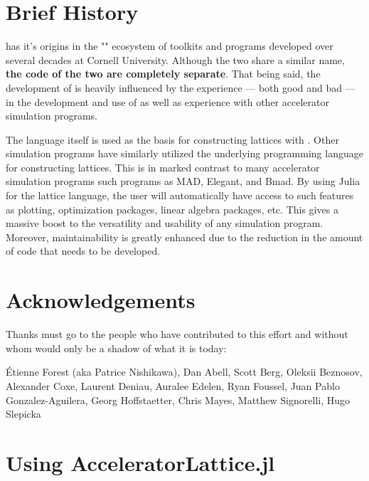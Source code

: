 \section{Brief History}

\scibmad has it's origins in the "\bmad"\cite{Sagan:Bmad2006} ecosystem of toolkits and programs 
developed over several
decades at Cornell University. Although the two share a similar name, {\bf the code of the two are
completely separate}. That being said, the development of \accellat is heavily influenced by the 
experience --- both good and bad --- in the development and use of \bmad as well as experience
with other accelerator simulation programs.

The \julia language itself is used as the basis for constructing lattices with \accellat. 
Other simulation programs
have similarly utilized the underlying programming language for constructing 
lattices\cite{Appleby:Merlin2020,Iadarola:Xsuite2023}. This is in marked contrast to many accelerator
simulation programs such programs as MAD\cite{Grote:MAD1989}, Elegant\cite{Borland:Elegant2000}, and
Bmad. 
By using Julia for the lattice language, the user will automatically have access to such features 
as plotting, optimization packages, linear algebra packages, etc. 
This gives a massive boost to the versatility and usability of any \scibmad simulation program.
Moreover, maintainability is greatly enhanced due to the reduction in the amount of code that needs
to be developed.

\section{Acknowledgements}

Thanks must go to the people who have contributed to this effort and without
whom \scibmad would only be a shadow of what it is today: 

\'Etienne Forest (aka Patrice Nishikawa),
Dan Abell,
Scott Berg,
Oleksii Beznosov,
Alexander Coxe,
Laurent Deniau,
Auralee Edelen,
Ryan Foussel,
Juan Pablo Gonzalez-Aguilera,
Georg Hoffstaetter,
Chris Mayes,
Matthew Signorelli,
Hugo Slepicka

\section{Using AcceleratorLattice.jl}


